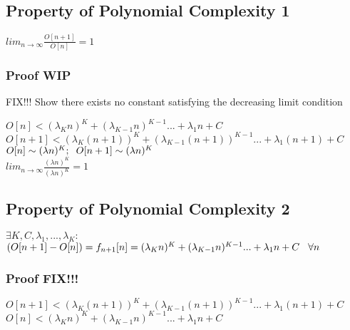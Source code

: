 \documentclass[11pt]{article}
\begin{document}
\subsection{Property of Polynomial  Complexity 1}
\begin{center}
$
lim_{n \rightarrow \infty} \frac{O[n+1]}{O[n]} = 1
$
\end{center}
\subsubsection{Proof WIP}
FIX!!!
Show there exists no constant satisfying the decreasing limit condition
\begin{center}
$
O[n] < (\lambda_K n)^K + (\lambda_{K-1} n)^{K-1}... + \lambda_1 n + C
$
\\ \vspace{2mm}
$
O[n+1] < (\lambda_K (n+1))^K + (\lambda_{K-1} (n+1))^{K-1}... + \lambda_1 (n+1) + C
$
\\ \vspace{2mm}
$
O[n] \sim (\lambda n)^K; \hspace{2mm} O[n+1] \sim  (\lambda n)^K
$
\\ \vspace{2mm}
$
lim_{n \rightarrow \infty} \frac{(\lambda n)^K}{(\lambda n)^K} = 1
$
\end{center}







\subsection{Property of Polynomial Complexity 2}
\begin{center}
$
\exists K,C,\lambda_1,...,\lambda_K :
$
\\ \vspace{2mm}
$
( O[n+1] - O[n] ) = f_{n+1}[n] = (\lambda_K n)^K + (\lambda_{K-1} n)^{K-1}... + \lambda_1 n + C \hspace{3mm} \forall n
$
\end{center}
\subsubsection{Proof FIX!!!}
\begin{center}
$
O[n+1] < (\lambda_K (n+1))^K + (\lambda_{K-1} (n+1))^{K-1}... + \lambda_1 (n+1) + C
$
\\ \vspace{2mm}
$
O[n] < (\lambda_K n)^K + (\lambda_{K-1} n)^{K-1}... + \lambda_1 n + C
$

\end{center}
\end{document}
